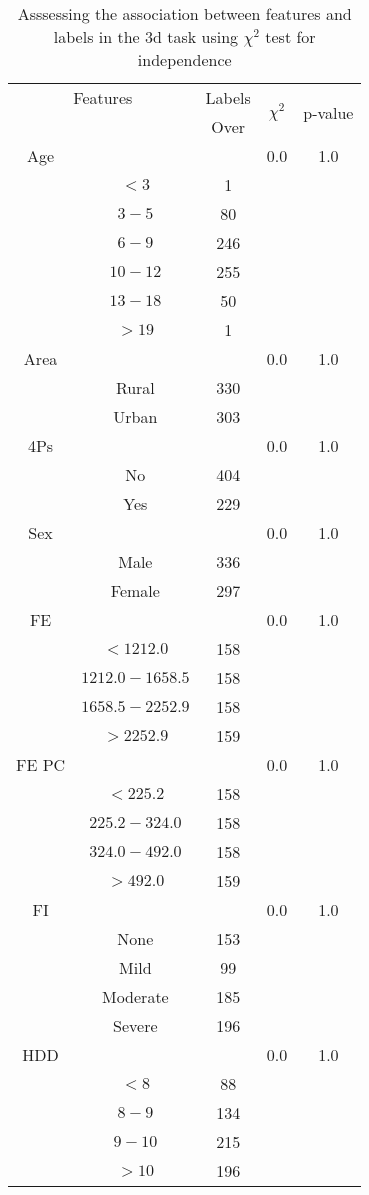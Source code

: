 \begin{table}[!htb]
\centering
\caption{Asssessing the association between features and labels in the 3d task using $\chi^2$ test for independence}
\label{tab:chitest_3d}
\begin{tabular}{c c | c| c | c}
\hline
\multicolumn{2}{c|}{Features}& \multicolumn{1}{c|}{Labels}& \multirow{2}{*}{$\chi^2$} & \multirow{2}{*}{p-value}\\ 
& & Over & & \\ 
\hline
Age &  & & 0.0 & 1.0 \\ 
& $< 3$ & 1& & \\ 
& $3-5$ & 80& & \\ 
& $6-9$ & 246& & \\ 
& $10-12$ & 255& & \\ 
& $13-18$ & 50& & \\ 
& $> 19$ & 1& & \\ 
\hline 
Area &  & & 0.0 & 1.0 \\ 
& Rural & 330& & \\ 
& Urban & 303& & \\ 
\hline 
4Ps &  & & 0.0 & 1.0 \\ 
& No & 404& & \\ 
& Yes & 229& & \\ 
\hline 
Sex &  & & 0.0 & 1.0 \\ 
& Male & 336& & \\ 
& Female & 297& & \\ 
\hline 
FE &  & & 0.0 & 1.0 \\ 
& $< 1212.0$ & 158& & \\ 
& $1212.0-1658.5$ & 158& & \\ 
& $1658.5-2252.9$ & 158& & \\ 
& $> 2252.9$ & 159& & \\ 
\hline 
FE PC &  & & 0.0 & 1.0 \\ 
& $< 225.2$ & 158& & \\ 
& $225.2-324.0$ & 158& & \\ 
& $324.0-492.0$ & 158& & \\ 
& $> 492.0$ & 159& & \\ 
\hline 
FI &  & & 0.0 & 1.0 \\ 
& None & 153& & \\ 
& Mild & 99& & \\ 
& Moderate & 185& & \\ 
& Severe & 196& & \\ 
\hline 
HDD &  & & 0.0 & 1.0 \\ 
& $< 8$ & 88& & \\ 
& $8-9$ & 134& & \\ 
& $9-10$ & 215& & \\ 
& $> 10$ & 196& & \\ 
\hline 
\end{tabular}
\end{table}
